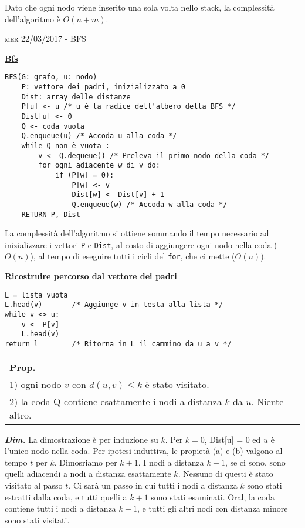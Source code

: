 \documentclass[a4paper,10pt]{article} %
\newcommand{\dimo}[1]{%
    \smallbreak \par \hfill\begin{minipage}{0.92\linewidth}{ \scriptsize {\textbf{\em{Dim.}}} {#1} }\end{minipage} \smallskip \par}
\newcommand{\malgorithm}[1]{%
    {\bigbreak \par \hspace*{4pt} \underline{\textbf {#1}}}}
\newcommand{\msection}[1]{%
    {\newpage\bigbreak \bigbreak \par \hfil \huge \textsc {#1}}\par}
\renewcommand{\t}[1]{%
    {\texttt{#1}}}
\newcommand{\mprop}[1]{%
    {\smallbreak\par\begin{tabular}{ll} \textbf{Prop.} & \begin{minipage}[t]{0.8\columnwidth}\emph  {#1}\end{minipage}\tabularnewline \end{tabular}}\smallskip\par}
\begin{document}
Dato che ogni nodo viene inserito una sola volta nello stack, la complessità dell'algoritmo è $O(n+m)$.





\msection{mer 22/03/2017 - BFS}



\malgorithm{Bfs}
\begin{lstlisting}
BFS(G: grafo, u: nodo)
    P: vettore dei padri, inizializzato a 0
    Dist: array delle distanze
    P[u] <- u /* u è la radice dell'albero della BFS */
    Dist[u] <- 0
    Q <- coda vuota
    Q.enqueue(u) /* Accoda u alla coda */
    while Q non è vuota :
        v <- Q.dequeue() /* Preleva il primo nodo della coda */
        for ogni adiacente w di v do:
            if (P[w] = 0):
                P[w] <- v
                Dist[w] <- Dist[v] + 1
                Q.enqueue(w) /* Accoda w alla coda */
    RETURN P, Dist
\end{lstlisting}

La complessità dell'algoritmo si ottiene sommando il tempo necessario ad inizializzare i vettori \t{P} e \t{Dist}, al costo di aggiungere ogni nodo nella coda ($O(n)$), al tempo di eseguire tutti i cicli del \t{for}, che ci mette ($O(n)$).

\malgorithm{Ricostruire percorso dal vettore dei padri}
\begin{lstlisting}
L = lista vuota
L.head(v)       /* Aggiunge v in testa alla lista */
while v <> u:
    v <- P[v]
    L.head(v)
return l        /* Ritorna in L il cammino da u a v */
\end{lstlisting}

\mprop{Per ogni $k = 0,1,2\ldots$, c'è un passo dell'algoritmo BFS in cui:\\
        1) ogni nodo $v$ con $d(u,v) \leq k$ è stato visitato.\\
        2) la coda Q contiene esattamente i nodi a distanza $k$ da $u$. Niente altro.}

\dimo{
La dimostrazione è per induzione su $k$. Per $k = 0$, Dist[u] = 0 ed $u$ è l'unico nodo nella coda.  Per ipotesi induttiva, le propietà (a) e (b) valgono al tempo $t$ per $k$. Dimosriamo per $k + 1$.  I nodi a distanza $k + 1$, se ci sono, sono quelli adiacendi a nodi a distanza esattamente $k$. Nessuno di questi è stato visitato al passo $t$.  Ci sarà un passo in cui tutti i nodi a distanza $k$ sono stati estratti dalla coda, e tutti quelli a $k + 1$ sono stati esaminati. Oral, la coda contiene tutti i nodi a distanza $k + 1$, e tutti gli altri nodi con distanza minore sono stati visitati.
}
\end{document}
